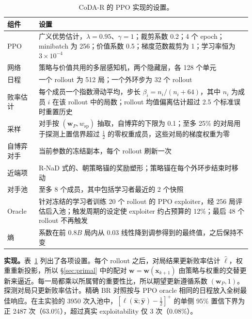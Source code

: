 \documentclass{article}
\theoremstyle{plain}
\theoremstyle{remark}
\newcommand{\bx}{{\bm{x}}}
\newcommand{\by}{{\bm{y}}}
\newcommand{\bw}{{\bm{w}}}
\newcommand{\bell}{{\bm{\ell}}}
\newcommand{\wsp}{w_{\mathrm{sp}}}
\newcommand{\codar}{CoDA-R}
\begin{document}
\begin{table}[!htbp]
\caption{\codar{} 的 PPO 实现的设置。}
\label{tab:settings}
\begin{center}
\footnotesize
\begin{tabular}{lp{10.5cm}}
\toprule
组件 & 设置 \\
\midrule
PPO & 广义优势估计\citep{schulman2016gae}，$\lambda=0.95$、$\gamma=1$；裁剪系数 0.2；4 个 epoch；minibatch 为 256；价值系数 0.5；梯度范数裁剪为 1；学习率恒为 $3\times10^{-4}$ \\
网络 & 策略与价值共用的多层感知机，两个隐藏层，各 128 个单元 \\
日程 & 一个 rollout 为 512 局；一个外环步为 32 个 rollout \\
败率估计 & 每个成员一个指数滑动平均，步长 $\beta_i=n_i/(n_i+64)$，其中 $n_i$ 为成员 $i$ 在该 rollout 中的局数；rollout 均值偏离估计超过 2.5 个标准误时重置历史 \\
采样 & 对手按 $(\bw_P,\wsp)$ 抽取，自博弈的下限为 0.1；至多 25\% 的对局用于探测上置信界超过 $\tfrac12$ 的零权重成员，这些对局的梯度权重为零 \\
自博弈对手 & 当前参数的冻结副本，每个 rollout 刷新一次 \\
近端项 & R-NaD 式的、朝策略锚的奖励塑形；策略锚在每个外环步结束时移动 \\
对手池 & 至多 8 个成员，其中包括学习者最近的 2 个快照 \\
Oracle & 针对冻结的学习者训练 20 个 rollout 的 PPO exploiter，经 256 局评估后入池；触发周期的设定使 exploiter 约占预算的 12\%；最后 48 个 rollout 不再触发 \\
熵 & 系数在前 $0.8B$ 局内从 0.03 线性降到调参得到的最终值，之后保持不变 \\
\bottomrule
\end{tabular}
\end{center}
\end{table}

\textbf{实现。}表~\ref{tab:settings} 列出了各项设置。每个 rollout 之后，对局结果更新败率估计 $\hat{\bell}$，权重重新投影，所以 \S\ref{sec:primal} 中的配对 $\bw=\bw(\bx_{k+1})$ 由策略与权重的交替更新来逼近。每一局都乘以所属臂的重要性比，所以期望更新遵循系数 $(\bw_P,1)$。探测对局只更新败率估计。精确 BR 对照按与 PPO oracle 相同的日程放入全树最佳响应。在主实验的 3950 次入池中，$[\ell(\hat\bx;\hat\by)-\tfrac12]^+$ 的单侧 95\% 置信下界为正 2487 次（63.0\%），超过真实 exploitability 仅 3 次（0.08\%）。
\end{document}
